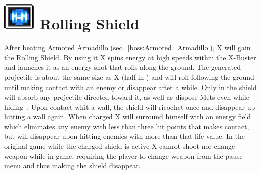 \section{\includegraphics[scale=0.2]{figures/X1/weapons/Rolling_S.jpg} Rolling Shield}\label{Rolling_shield}
After beating Armored Armadillo (sec.~\ref{boss:Armored_Armadillo}), X will gain the Rolling Shield. By using it X spins energy at high speeds within the X-Buster and launches it as an energy shot that rolls along the ground. The generated projectile is about the same size as X (half in \mhx) and will roll following the ground until making contact with an enemy or disappear after a while. Only in \mhx the shield will absorb any projectile directed toward it, as well as dispose Mets even while hiding~\cite{wiki:Rolling_shield}. Upon contact whit a wall, the shield will ricochet once and disappear up hitting a wall again. When charged X will surround himself with an energy field which eliminates any enemy with less than three hit points that makes contact, but will disappear upon hitting enemies with more than that life value. In the original game while the charged shield is active X cannot shoot nor change weapon while in game, requiring the player to change weapon from the pause menu and thus making the shield disappear.
